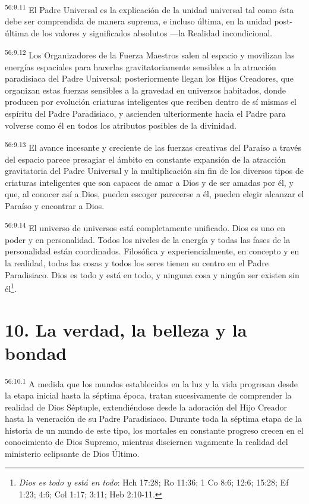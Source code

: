 \par
\textsuperscript{56:9.11} El Padre Universal es la explicación de la unidad universal tal como ésta debe ser comprendida de manera suprema, e incluso última, en la unidad post-última de los valores y significados absolutos ---la Realidad incondicional.

\par
\textsuperscript{56:9.12} Los Organizadores de la Fuerza Maestros salen al espacio y movilizan las energías espaciales para hacerlas gravitatoriamente sensibles a la atracción paradisiaca del Padre Universal; posteriormente llegan los Hijos Creadores, que organizan estas fuerzas sensibles a la gravedad en universos habitados, donde producen por evolución criaturas inteligentes que reciben dentro de sí mismas el espíritu del Padre Paradisiaco, y ascienden ulteriormente hacia el Padre para volverse como él en todos los atributos posibles de la divinidad.

\par
\textsuperscript{56:9.13} El avance incesante y creciente de las fuerzas creativas del Paraíso a través del espacio parece presagiar el ámbito en constante expansión de la atracción gravitatoria del Padre Universal y la multiplicación sin fin de los diversos tipos de criaturas inteligentes que son capaces de amar a Dios y de ser amadas por él, y que, al conocer así a Dios, pueden escoger parecerse a él, pueden elegir alcanzar el Paraíso y encontrar a Dios.

\par
\textsuperscript{56:9.14} El universo de universos está completamente unificado. Dios es uno en poder y en personalidad. Todos los niveles de la energía y todas las fases de la personalidad están coordinados. Filosófica y experiencialmente, en concepto y en la realidad, todas las cosas y todos los seres tienen su centro en el Padre Paradisiaco. Dios es todo y está en todo, y ninguna cosa y ningún ser existen sin él\footnote{\textit{Dios es todo y está en todo}: Hch 17:28; Ro 11:36; 1 Co 8:6; 12:6; 15:28; Ef 1:23; 4:6; Col 1:17; 3:11; Heb 2:10-11.}.

\section*{10. La verdad, la belleza y la bondad}
\par
\textsuperscript{56:10.1} A medida que los mundos establecidos en la luz y la vida progresan desde la etapa inicial hasta la séptima época, tratan sucesivamente de comprender la realidad de Dios Séptuple, extendiéndose desde la adoración del Hijo Creador hasta la veneración de su Padre Paradisiaco. Durante toda la séptima etapa de la historia de un mundo de este tipo, los mortales en constante progreso crecen en el conocimiento de Dios Supremo, mientras disciernen vagamente la realidad del ministerio eclipsante de Dios Último.

